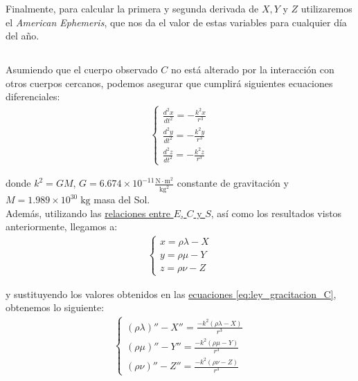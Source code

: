 \documentclass[11pt]{article}
\begin{document}
Finalmente, para calcular la primera y segunda derivada de $X, Y$ y $Z$ utilizaremos el \textit{American Ephemeris}, que nos da el valor de estas variables para cualquier día del año.\\

\subsection{}
Asumiendo que el cuerpo observado $C$ no está alterado por la interacción con otros cuerpos cercanos, podemos asegurar que cumplirá siguientes ecuaciones diferenciales:
\begin{align}
\left\{
\begin{array}{l}
	\frac{d^2x}{dt^2}=-\frac{k^2x}{r^3}\\
	\frac{d^2y}{dt^2}=-\frac{k^2y}{r^3}\\
	\frac{d^2z}{dt^2}=-\frac{k^2z}{r^3}
\end{array}
\right.
\label{eq:ley_gracitacion_C}
\end{align}

\noindent donde $k^2=GM$, $G=6.674\times10^{-11}\frac{\text{N}\cdot\text{m}^2}{\text{kg}^2}$ constante de gravitación y $M=1.989\times10^{30}\;\text{kg}$ masa del Sol.\\

Además, utilizando las \hyperref[eq:terminologia]{relaciones entre $E$, $C$ y $S$}, así como los resultados vistos anteriormente, llegamos a:
\begin{align}
\left\{
\begin{array}{l}
	x=\rho\lambda-X\\
	y=\rho\mu-Y\\
	z=\rho\nu-Z
\end{array}
\right.
\label{eq:relacion_C_S_E}
\end{align}

\noindent y sustituyendo los valores obtenidos en las  \hyperref[eq:ley_gracitacion_C]{ecuaciones \ref{eq:ley_gracitacion_C}}, obtenemos lo siguiente:
\begin{align}
\left\{
\begin{array}{l}
	(\rho\lambda)'' - X'' = \frac{-k^2(\rho\lambda-X)}{r^3}\\
	(\rho\mu)'' - Y'' = \frac{-k^2(\rho\mu-Y)}{r^3}\\
	(\rho\nu)'' - Z'' = \frac{-k^2(\rho\nu-Z)}{r^3}
\end{array}
\right.
\label{eq:derivada_segunda}
\end{align}
\end{document}
